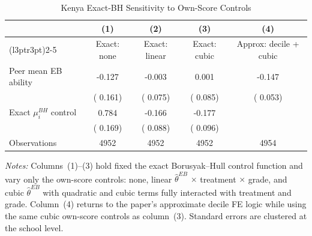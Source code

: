 \begin{table}[H]
\centering
\caption{Kenya Exact-BH Sensitivity to Own-Score Controls}
\label{tab:peer_effects_exact_kenya_controls}
\begin{threeparttable}
\begin{tabular}[t]{lcccc}
\toprule
 & (1) & (2) & (3) & (4) \\
\cmidrule(l{3pt}r{3pt}){2-5}
 & Exact: none & Exact: linear & Exact: cubic & Approx: decile + cubic \\
\midrule
Peer mean EB ability &  -0.127 &  -0.003 &   0.001 &  -0.147 \\
 & (  0.161) & (  0.075) & (  0.085) & (  0.053) \\
Exact $\mu_i^{BH}$ control &   0.784 &  -0.166 &  -0.177 &  \\
 & (  0.169) & (  0.088) & (  0.096) &  \\
\addlinespace
Observations & 4952 & 4952 & 4952 & 4954 \\
\bottomrule
\end{tabular}
\begin{tablenotes}
\footnotesize
\item \textit{Notes:} Columns~(1)--(3) hold fixed the exact Borusyak--Hull control function and vary only the own-score controls: none, linear $\hat{\theta}^{EB}$ $\times$ treatment $\times$ grade, and cubic $\hat{\theta}^{EB}$ with quadratic and cubic terms fully interacted with treatment and grade. Column~(4) returns to the paper's approximate decile FE logic while using the same cubic own-score controls as column~(3). Standard errors are clustered at the school level.
\end{tablenotes}
\end{threeparttable}
\end{table}
